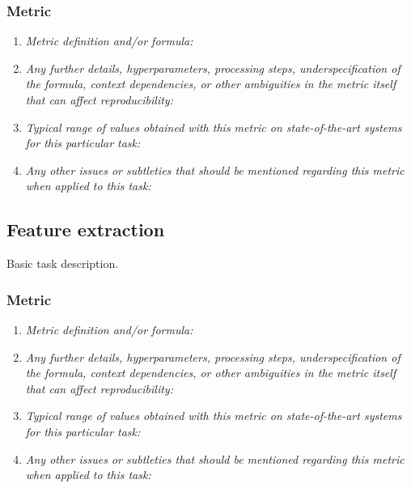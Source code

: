 \documentclass[a4paper,11pt]{article}
\begin{document}
        \subsubsection{Metric}
            \begin{enumerate}[label=\alph*.]
                \item \textit{Metric definition and/or formula:}
                \bigskip
                \item \textit{Any further details, hyperparameters, processing steps, underspecification of the formula, context dependencies, or other ambiguities in the metric itself that can affect reproducibility:}
                \bigskip
                \item \textit{Typical range of values obtained with this metric on state-of-the-art systems for this particular task:}
                \bigskip
                \item \textit{Any other issues or subtleties that should be mentioned regarding this metric when applied to this task:}
                \bigskip
            \end{enumerate}

    \subsection{Feature extraction}
        Basic task description.
        \subsubsection{Metric}
            \begin{enumerate}[label=\alph*.]
                \item \textit{Metric definition and/or formula:}
                \bigskip
                \item \textit{Any further details, hyperparameters, processing steps, underspecification of the formula, context dependencies, or other ambiguities in the metric itself that can affect reproducibility:}
                \bigskip
                \item \textit{Typical range of values obtained with this metric on state-of-the-art systems for this particular task:}
                \bigskip
                \item \textit{Any other issues or subtleties that should be mentioned regarding this metric when applied to this task:}
                \bigskip
            \end{enumerate}
\end{document}
